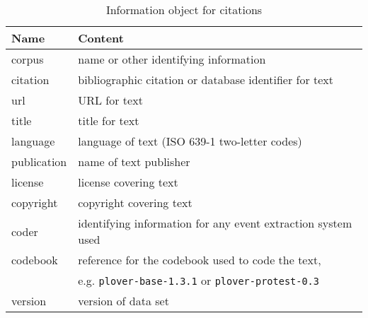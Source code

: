 \documentclass[11pt]{report}
\begin{document}
\begin{table}[htp]
\caption{Information object for citations }
\begin{center}
\begin{tabular}{|l|l|}
\hline
Name & Content \\
\hline
corpus & name or other identifying information\\
citation &  bibliographic citation or database identifier for text\\
url &  URL for text\\
title &  title for text\\
language & language of text (ISO 639-1 two-letter codes)\\
publication & name of text publisher\\
license & license covering text\\
copyright & copyright covering text\\
coder &  identifying information for any event extraction system used\\
codebook &  reference for the codebook used to code the text,\\
& e.g. \texttt{plover-base-1.3.1} or \texttt{plover-protest-0.3}\\
version &  version of data set\\
\hline
\end{tabular}
\end{center}
\label{tab:citeinfo}
\end{table}%
\end{document}
